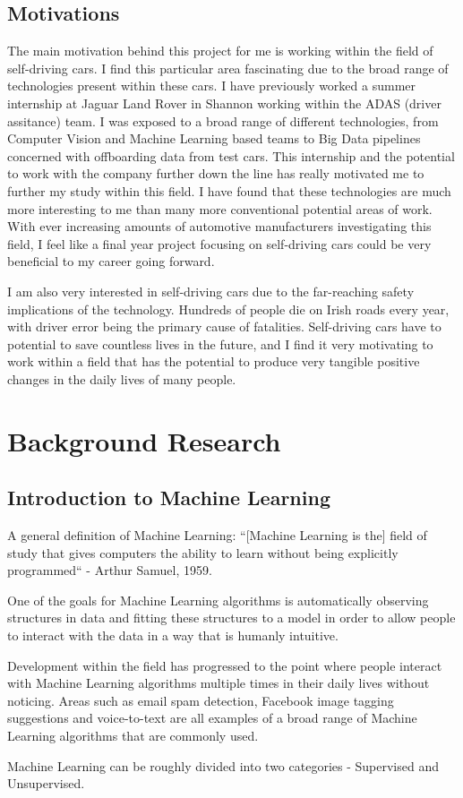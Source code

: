 \documentclass[12pt]{report}
\begin{document}
\newpage
\section{Motivations}
\begin{flushleft}
The main motivation behind this project for me is working within the field of self-driving cars. I find this particular area fascinating due to the broad range of technologies present within these cars. I have previously worked a summer internship at Jaguar Land Rover in Shannon working within the ADAS (driver assitance) team. I was exposed to a broad range of different technologies, from Computer Vision and Machine Learning based teams to Big Data pipelines concerned with offboarding data from test cars. This internship and the potential to work with the company further down the line has really motivated me to further my study within this field. I have found that these technologies are much more interesting to me than many more conventional potential areas of work. With ever increasing amounts of automotive manufacturers investigating this field, I feel like a final year project focusing on self-driving cars could be very beneficial to my career going forward.

I am also very interested in self-driving cars due to the far-reaching safety implications of the technology. Hundreds of people die on Irish roads every year, with driver error being the primary cause of fatalities. Self-driving cars have to potential to save countless lives in the future, and I find it very motivating to work within a field that has the potential to produce very tangible positive changes in the daily lives of many people.
\end{flushleft}

\newpage
\chapter{Background Research}
\section{Introduction to Machine Learning}
\begin{flushleft}
A general definition of Machine Learning:
``[Machine Learning is the] field of study that gives computers the ability to learn without being explicitly programmed`` - Arthur Samuel, 1959.

One of the goals for Machine Learning algorithms is automatically observing structures in data and fitting these structures to a model in order to allow people to interact with the data in a way that is humanly intuitive.

Development within the field has progressed to the point where people interact with Machine Learning algorithms multiple times in their daily lives without noticing. Areas such as email spam detection, Facebook image tagging suggestions and voice-to-text are all examples of a broad range of Machine Learning algorithms that are commonly used.

Machine Learning can be roughly divided into two categories - Supervised and Unsupervised. 
\end{flushleft}
\end{document}
